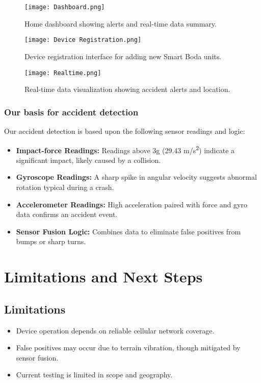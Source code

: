 \documentclass[12pt]{article}
\begin{document}
\begin{figure}[H]
  \centering
  \texttt{[image: Dashboard.png]}
  \caption{Home dashboard showing alerts and real-time data summary.}
  \label{fig:dashboard}
\end{figure}

\begin{figure}[H]
  \centering
  \texttt{[image: Device Registration.png]}
  \caption{Device registration interface for adding new Smart Boda units.}
  \label{fig:registration}
\end{figure}

\begin{figure}[H]
  \centering
  \texttt{[image: Realtime.png]}
  \caption{Real-time data visualization showing accident alerts and location.}
  \label{fig:realtime}
\end{figure}

\subsubsection{Our basis for accident detection}
Our accident detection is based upon the following sensor readings and logic:

\begin{itemize}
  \item \textbf{Impact-force Readings:} Readings above 3g (29.43 m/s\textsuperscript{2}) indicate a significant impact, likely caused by a collision.
  \item \textbf{Gyroscope Readings:} A sharp spike in angular velocity suggests abnormal rotation typical during a crash.
  \item \textbf{Accelerometer Readings:} High acceleration paired with force and gyro data confirms an accident event.
  \item \textbf{Sensor Fusion Logic:} Combines data to eliminate false positives from bumps or sharp turns.
\end{itemize}

\section{Limitations and Next Steps}

\subsection{Limitations}
\begin{itemize}
  \item Device operation depends on reliable cellular network coverage.
  \item False positives may occur due to terrain vibration, though mitigated by sensor fusion.
  \item Current testing is limited in scope and geography.
\end{itemize}
\end{document}
